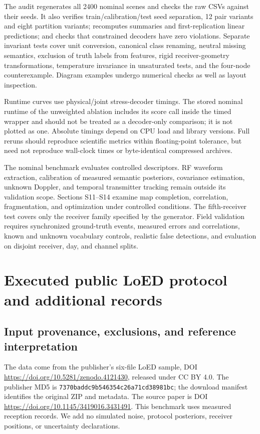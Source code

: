 \documentclass[10pt,a4paper]{article}
\begin{document}
The audit regenerates all 2400 nominal scenes and checks the raw CSVs against their seeds. It also verifies train/calibration/test seed separation, 12 pair variants and eight partition variants; recomputes summaries and first-replication linear predictions; and checks that constrained decoders have zero violations. Separate invariant tests cover unit conversion, canonical class renaming, neutral missing semantics, exclusion of truth labels from features, rigid receiver-geometry transformations, temperature invariance in unsaturated tests, and the four-node counterexample. Diagram examples undergo numerical checks as well as layout inspection.

Runtime curves use physical/joint stress-decoder timings. The stored nominal runtime of the unweighted ablation includes its score call inside the timed wrapper and should not be treated as a decoder-only comparison; it is not plotted as one. Absolute timings depend on CPU load and library versions. Full reruns should reproduce scientific metrics within floating-point tolerance, but need not reproduce wall-clock times or byte-identical compressed archives.

The nominal benchmark evaluates controlled descriptors. RF waveform extraction, calibration of measured semantic posteriors, covariance estimation, unknown Doppler, and temporal transmitter tracking remain outside its validation scope. Sections S11--S14 examine map completion, correlation, fragmentation, and optimization under controlled conditions. The fifth-receiver test covers only the receiver family specified by the generator. Field validation requires synchronized ground-truth events, measured errors and correlations, known and unknown vocabulary controls, realistic false detections, and evaluation on disjoint receiver, day, and channel splits.
\section{Executed public LoED protocol and additional records}
\subsection{Input provenance, exclusions, and reference interpretation}
The data come from the publisher's six-file LoED sample, DOI \url{https://doi.org/10.5281/zenodo.4121430}, released under CC BY 4.0. The publisher MD5 is \texttt{7370baddc9b546354c26a71cd38981bc}; the download manifest identifies the original ZIP and metadata. The source paper is DOI \url{https://doi.org/10.1145/3419016.3431491}. This benchmark uses measured reception records. We add no simulated noise, protocol posteriors, receiver positions, or uncertainty declarations.
\end{document}
